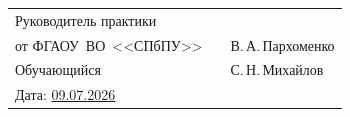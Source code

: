 \vspace{0pt plus1fill}

\noindent
\begin{tabularx}{\linewidth}{lXl}
  Руководитель практики     & & \\
  от ФГАОУ~ВО~<<СПбПУ>>    & & В.\,А.\,Пархоменко  \\[14pt]
  Обучающийся               & & С.\,Н.\,Михайлов    \\[14pt]
  Дата: \uline{09.07.2026}  & &
\end{tabularx}

\vspace{0pt plus4fill}

\restoregeometry
\newpage
